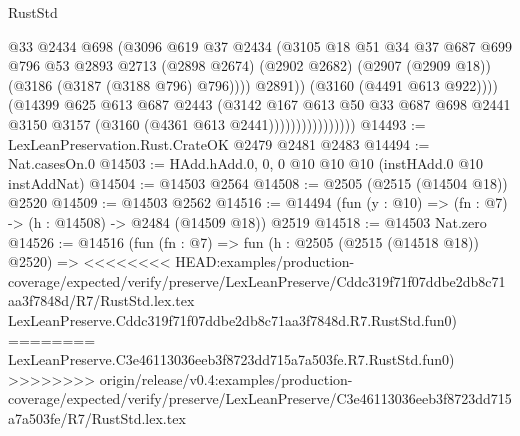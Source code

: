 \begin{lexlean}{RustStd}
\begin{coremodule}
{\begin{coremodule}
{{{{{{{{{{{{{{{{{{{{                                    @33
                                    @2434
                                    @698
                                    (@3096
                                      @619
                                      @37
                                      @2434
                                      (@3105
                                        @18
                                        @51
                                        @34
                                        @37
                                        @687
                                        @699
                                        @796
                                        @53
                                        @2893
                                        @2713
                                        (@2898 @2674)
                                        (@2902 @2682)
                                        (@2907 (@2909 @18))
                                        (@3186 (@3187 (@3188 @796) @796))))
                                    @2891))
                                (@3160 (@4491 @613 @922))))
                            (@14399
                              @625
                              @613
                              @687
                              @2443
                              (@3142
                                @167
                                @613
                                @50
                                @33
                                @687
                                @698
                                @2441
                                @3150
                                @3157
                                (@3160 (@4361 @613 @2441))))))))))))))))
@14493 := LexLeanPreservation.Rust.CrateOK @2479 @2481 @2483
@14494 := Nat.casesOn.{0}
@14503 := HAdd.hAdd.{0, 0, 0} @10 @10 @10 (instHAdd.{0} @10 instAddNat)
@14504 := @14503 @2564
@14508 := @2505 (@2515 (@14504 @18)) @2520
@14509 := @14503 @2562
@14516 := @14494 (fun (y : @10) => (fn : @7) -> (h : @14508) -> @2484 (@14509 @18)) @2519
@14518 := @14503 Nat.zero
@14526 := @14516
    (fun (fn : @7) =>
    fun (h : @2505 (@2515 (@14518 @18)) @2520) =>
<<<<<<<< HEAD:examples/production-coverage/expected/verify/preserve/LexLeanPreserve/Cddc319f71f07ddbe2db8c71aa3f7848d/R7/RustStd.lex.tex
    LexLeanPreserve.Cddc319f71f07ddbe2db8c71aa3f7848d.R7.RustStd.fun0)
========
    LexLeanPreserve.C3e46113036eeb3f8723dd715a7a503fe.R7.RustStd.fun0)
>>>>>>>> origin/release/v0.4:examples/production-coverage/expected/verify/preserve/LexLeanPreserve/C3e46113036eeb3f8723dd715a7a503fe/R7/RustStd.lex.tex
}}}}}}}}}}}}}}}}}}}}
\end{coremodule}}
\end{coremodule}
\end{lexlean}
